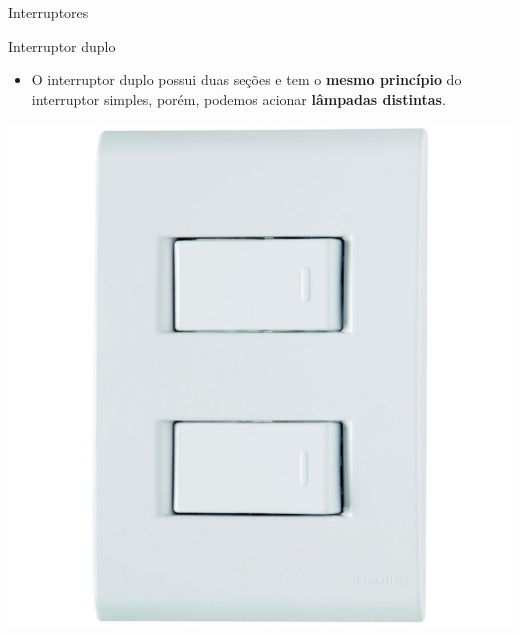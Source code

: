 \begin{frame}{Interruptores}
	\begin{block}{Interruptor duplo}
		\begin{itemize}
			\item O interruptor duplo possui duas seções e tem o \textbf{mesmo princípio} do interruptor simples, porém, podemos acionar \textbf{lâmpadas distintas}.
		\end{itemize}
	\end{block}

	\centering
	\includegraphics[height=0.7\textheight]{Figuras/Ch08/fig2}
\end{frame}


